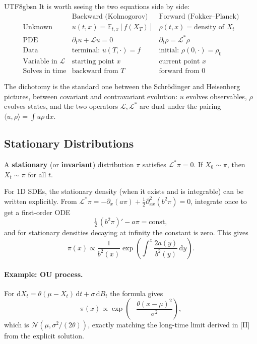 \documentclass{article}
\begin{document}
\begin{CJK*}{UTF8}{gbsn}
It is worth seeing the two equations side by side:
\[
  \begin{array}{l|ll}
  & \text{Backward (Kolmogorov)} & \text{Forward (Fokker--Planck)}\\
  \hline
  \text{Unknown} & u(t,x)=\mathbb{E}_{t,x}[f(X_T)] & \rho(t,x)=\text{density of }X_t\\
  \text{PDE} & \partial_t u+\mathcal{L}u=0 & \partial_t\rho=\mathcal{L}^*\rho\\
  \text{Data} & \text{terminal: }u(T,\cdot)=f & \text{initial: }\rho(0,\cdot)=\rho_0\\
  \text{Variable in }\mathcal{L} & \text{starting point }x & \text{current point }x\\
  \text{Solves in time} & \text{backward from }T & \text{forward from }0
  \end{array}
\]

The dichotomy is the standard one between the Schr\"odinger and Heisenberg pictures, between covariant and contravariant evolution: $u$ evolves observables, $\rho$ evolves states, and the two operators $\mathcal{L},\mathcal{L}^*$ are dual under the pairing $\langle u,\rho\rangle=\int u\rho\,\mathrm{d}x$.

\subsection{Stationary Distributions}

A \textbf{stationary} (or \textbf{invariant}) distribution $\pi$ satisfies $\mathcal{L}^*\pi=0$. If $X_0\sim\pi$, then $X_t\sim\pi$ for all $t$.

For 1D SDEs, the stationary density (when it exists and is integrable) can be written explicitly. From $\mathcal{L}^*\pi=-\partial_x(a\pi)+\tfrac12\partial_{xx}^2(b^2\pi)=0$, integrate once to get a first-order ODE
\[
  \tfrac{1}{2}\,(b^2\pi)'-a\pi=\text{const},
\]
and for stationary densities decaying at infinity the constant is zero. This gives
\[
  \pi(x)\propto\frac{1}{b^2(x)}\exp\!\left(\int^x \frac{2a(y)}{b^2(y)}\,\mathrm{d}y\right).
\]

\paragraph{Example: OU process.} For $\mathrm{d}X_t=\theta(\mu-X_t)\,\mathrm{d}t+\sigma\,\mathrm{d}B_t$ the formula gives
\[
  \pi(x)\propto\exp\!\left(-\frac{\theta(x-\mu)^2}{\sigma^2}\right),
\]
which is $\mathcal{N}(\mu,\sigma^2/(2\theta))$, exactly matching the long-time limit derived in [II] from the explicit solution.


\end{CJK*}
\end{document}
